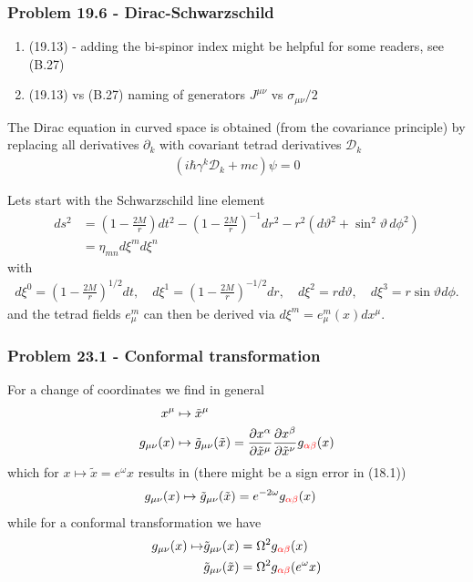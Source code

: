 \documentclass[10pt,a4paper]{article}
\theoremstyle{definition}
\begin{document}
\subsubsection{Problem 19.6 - Dirac-Schwarzschild}
\begin{enumerate}
    \item (19.13) - adding the bi-spinor index might be helpful for some readers, see (B.27)
    \item (19.13) vs (B.27) naming of generators $J^{\mu\nu}$ vs $\sigma_{\mu\nu}/2$
\end{enumerate}
The Dirac equation in curved space is obtained (from the covariance principle) by replacing all derivatives $\partial_k$ with covariant tetrad derivatives $\mathscr{D}_k$ 
\begin{align}
    (i\hbar\gamma^k\mathscr{D}_k+mc)\psi=0
\end{align}




Lets start with the Schwarzschild line element
\begin{align}
    ds^2&=\left(1-\frac{2M}{r}\right)dt^2-\left(1-\frac{2M}{r}\right)^{-1}dr^2-r^2(d\vartheta^2+\sin^2\vartheta\,d\phi^2)\\
    &=\eta_{mn}d\xi^md\xi^n
\end{align}
with
\begin{align}
    d\xi^0=\left(1-\frac{2M}{r}\right)^{1/2}dt,\quad d\xi^1=\left(1-\frac{2M}{r}\right)^{-1/2}dr,\quad d\xi^2=rd\vartheta,\quad d\xi^3=r\sin\vartheta d\phi.
\end{align}
and the tetrad fields $e^m_\mu$ can then be derived via $d\xi^m=e^m_\mu(x) dx^\mu$.



\subsubsection{Problem 23.1 - Conformal transformation}
For a change of coordinates we find in general
\begin{align}
    x^\mu&\mapsto\tilde{x}^\mu\\
    g_{\mu\nu}(x)&\mapsto\tilde{g}_{\mu\nu}(\tilde{x})=\frac{\partial x^\alpha}{\partial \tilde x^\mu}\frac{\partial x^\beta}{\partial \tilde x^\nu}g_{\textcolor{red}{\alpha\beta}}(x)
\end{align}
which for $x\mapsto\tilde{x}=e^{\omega}x$ results in (there might be a sign error in (18.1))
\begin{align}
    g_{\mu\nu}(x)&\mapsto\tilde{g}_{\mu\nu}(\tilde{x})=e^{-2\omega}g_{\textcolor{red}{\alpha\beta}}(x)
\end{align}
while for a conformal transformation we have 
\begin{align}
    g_{\mu\nu}(x)\mapsto &\tilde{g}_{\mu\nu}(x)=\Omega^2g_{\textcolor{red}{\alpha\beta}}(x)\\
    &\tilde{g}_{\mu\nu}(\tilde{x})=\Omega^2g_{\textcolor{red}{\alpha\beta}}(e^{\omega}x)
\end{align}
\end{document}
